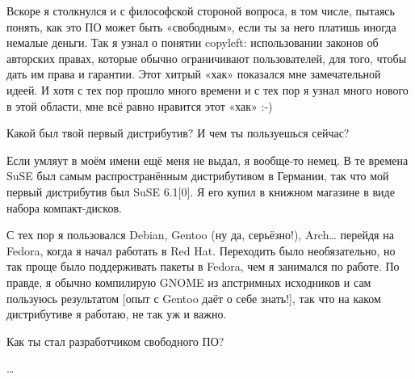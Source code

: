 \documentclass[10pt, a5paper]{article}
\begin{document}
\begin{Parallel}[p]{}{}
{Вскоре я столкнулся и с философской стороной вопроса, в том числе, пытаясь понять, как это ПО может быть «свободным», если ты за него платишь иногда немалые деньги. Так я узнал о понятии copyleft: использовании законов об авторских правах, которые обычно ограничивают пользователей, для того, чтобы дать им права и гарантии. Этот хитрый «хак» показался мне замечательной идеей. И хотя с тех пор прошло много времени и с тех пор я узнал много нового в этой области, мне всё равно нравится этот «хак» :-)

\q Какой был твой первый дистрибутив? И чем ты пользуешься сейчас?

\a Если умляут в моём имени ещё меня не выдал, я вообще-то немец. В те времена SuSE был самым распространённым дистрибутивом в Германии, так что мой первый дистрибутив был SuSE 6.1[0]. Я его купил в книжном магазине в виде набора компакт-дисков.

С тех пор я пользовался Debian, Gentoo (ну да, серьёзно!), Arch… перейдя на Fedora, когда я начал работать в Red Hat. Переходить было необязательно, но так проще было поддерживать пакеты в Fedora, чем я занимался по работе. По правде, я обычно компилирую GNOME из апстримных исходников и сам пользуюсь результатом [опыт с Gentoo даёт о себе знать!], так что на каком дистрибутиве я работаю, не так уж и важно.

\q Как ты стал разработчиком свободного ПО?

…

     }
   \end{Parallel}









 
\end{document}
